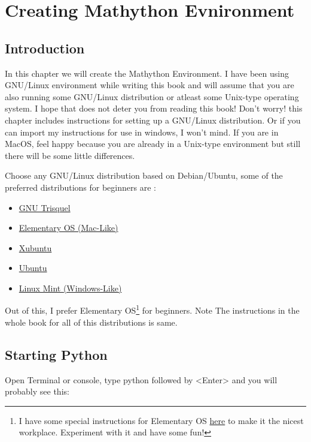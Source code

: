 
\chapter{Creating Mathython Evnironment}

\section{Introduction}

In this chapter we will create the {\color{cyan} Mathython}  Environment. I have been using GNU/Linux environment while writing this book
and will assume that you are also running some GNU/Linux distribution or atleast some Unix-type operating system. I hope that
does not deter you from reading this book! {\color{cyan} Don't worry! this chapter includes instructions for setting up a GNU/Linux distribution.}
Or if you can import my instructions for use in windows, I won't mind. If you are in MacOS, feel happy because you are already
in a Unix-type environment but still there will be some little differences.

Choose any GNU/Linux distribution based on Debian/Ubuntu, some of the preferred distributions for beginners are :

\begin{itemize}
\item \href{http://trisquel.info/}{GNU Trisquel}
\item \href{http://elementary.io}{Elementary OS (Mac-Like)}
\item \href{http://xubuntu.org}{Xubuntu}
\item \href{http://www.ubuntu.com}{Ubuntu}
\item \href{http://linuxmint.com}{Linux Mint (Windows-Like)}
\end{itemize}

Out of this, I prefer {\color{cyan} Elementary OS}\footnote{I have some special instructions for Elementary OS \href{http://itsfoss.com/top-ten-installing-elementary-os-luna/}{here} to make it the nicest workplace. Experiment with it and have some fun!} for beginners. Note The instructions in the whole book for all of this distributions is same.

\section{Starting Python}

Open Terminal or console, type {\color{magenta} python} followed by {\color{magenta} <Enter>} and you will probably see this:


